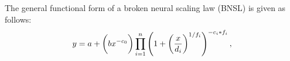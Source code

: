 \documentclass{article} %
\begin{document}


\vspace{-2.2mm}

The general functional form of a broken neural scaling law (BNSL) is given as follows:
\begin{equation}
\vspace{-1.0mm}
y =  a + \bigg(bx^{-c_0}\bigg) \prod_{i=1}^n \left(1 + \left(\frac{x}{d_i}\right)^{1/f_i}\right)^{-c_i * f_i},
\label{eq:BNSL}
\end{equation}

\end{document}
